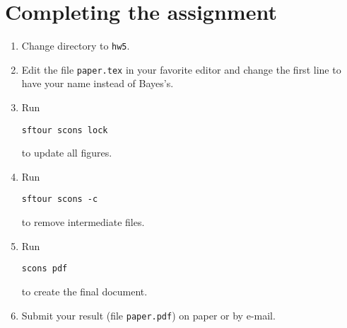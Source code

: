 \section{Completing the assignment}

\begin{enumerate}
\item Change directory to \texttt{hw5}.
\item Edit the file \texttt{paper.tex} in your favorite editor and change the
  first line to have your name instead of Bayes's.
\item Run
\begin{verbatim}
sftour scons lock
\end{verbatim}
to update all figures.
\item Run
\begin{verbatim}
sftour scons -c
\end{verbatim}
to remove intermediate files.
\item Run
\begin{verbatim}
scons pdf
\end{verbatim}
to create the final document.
\item Submit your result (file \texttt{paper.pdf}) on paper or by
e-mail.
\end{enumerate}




